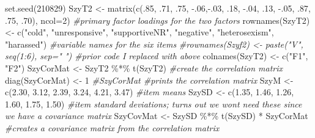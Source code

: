 \documentclass[
  english,
]{book}
\newenvironment{Shaded}{\begin{snugshade}}{\end{snugshade}}
\newcommand{\AttributeTok}[1]{\textcolor[rgb]{0.77,0.63,0.00}{#1}}
\newcommand{\CommentTok}[1]{\textcolor[rgb]{0.56,0.35,0.01}{\textit{#1}}}
\newcommand{\DecValTok}[1]{\textcolor[rgb]{0.00,0.00,0.81}{#1}}
\newcommand{\FloatTok}[1]{\textcolor[rgb]{0.00,0.00,0.81}{#1}}
\newcommand{\FunctionTok}[1]{\textcolor[rgb]{0.00,0.00,0.00}{#1}}
\newcommand{\NormalTok}[1]{#1}
\newcommand{\OtherTok}[1]{\textcolor[rgb]{0.56,0.35,0.01}{#1}}
\newcommand{\SpecialCharTok}[1]{\textcolor[rgb]{0.00,0.00,0.00}{#1}}
\newcommand{\StringTok}[1]{\textcolor[rgb]{0.31,0.60,0.02}{#1}}
\begin{document}
\begin{Shaded}
\begin{Highlighting}[]
\FunctionTok{set.seed}\NormalTok{(}\DecValTok{210829}\NormalTok{)}
\NormalTok{SzyT2 }\OtherTok{\textless{}{-}} \FunctionTok{matrix}\NormalTok{(}\FunctionTok{c}\NormalTok{(.}\DecValTok{85}\NormalTok{, .}\DecValTok{71}\NormalTok{, .}\DecValTok{75}\NormalTok{, }\SpecialCharTok{{-}}\NormalTok{.}\DecValTok{06}\NormalTok{,}\SpecialCharTok{{-}}\NormalTok{.}\DecValTok{03}\NormalTok{, .}\DecValTok{18}\NormalTok{, }\SpecialCharTok{{-}}\NormalTok{.}\DecValTok{04}\NormalTok{, .}\DecValTok{13}\NormalTok{, }\SpecialCharTok{{-}}\NormalTok{.}\DecValTok{05}\NormalTok{, .}\DecValTok{87}\NormalTok{, .}\DecValTok{75}\NormalTok{, .}\DecValTok{70}\NormalTok{), }\AttributeTok{ncol=}\DecValTok{2}\NormalTok{) }\CommentTok{\#primary factor loadings for the two factors}
\FunctionTok{rownames}\NormalTok{(SzyT2) }\OtherTok{\textless{}{-}} \FunctionTok{c}\NormalTok{(}\StringTok{"cold"}\NormalTok{, }\StringTok{"unresponsive"}\NormalTok{, }\StringTok{"supportiveNR"}\NormalTok{, }\StringTok{"negative"}\NormalTok{, }\StringTok{"heterosexism"}\NormalTok{, }\StringTok{"harassed"}\NormalTok{) }\CommentTok{\#variable names for the six items}
\CommentTok{\#rownames(Szyf2) \textless{}{-} paste("V", seq(1:6), sep=" ") \#prior code I replaced with above}
\FunctionTok{colnames}\NormalTok{(SzyT2) }\OtherTok{\textless{}{-}} \FunctionTok{c}\NormalTok{(}\StringTok{"F1"}\NormalTok{, }\StringTok{"F2"}\NormalTok{)}
\NormalTok{SzyCorMat }\OtherTok{\textless{}{-}}\NormalTok{ SzyT2 }\SpecialCharTok{\%*\%} \FunctionTok{t}\NormalTok{(SzyT2) }\CommentTok{\#create the correlation matrix}
\FunctionTok{diag}\NormalTok{(SzyCorMat) }\OtherTok{\textless{}{-}} \DecValTok{1}
\CommentTok{\#SzyCorMat \#prints the correlation matrix}
\NormalTok{SzyM }\OtherTok{\textless{}{-}} \FunctionTok{c}\NormalTok{(}\FloatTok{2.30}\NormalTok{, }\FloatTok{3.12}\NormalTok{, }\FloatTok{2.39}\NormalTok{, }\FloatTok{3.24}\NormalTok{, }\FloatTok{4.21}\NormalTok{, }\FloatTok{3.47}\NormalTok{) }\CommentTok{\#item means}
\NormalTok{SzySD }\OtherTok{\textless{}{-}} \FunctionTok{c}\NormalTok{(}\FloatTok{1.35}\NormalTok{, }\FloatTok{1.46}\NormalTok{, }\FloatTok{1.26}\NormalTok{, }\FloatTok{1.60}\NormalTok{, }\FloatTok{1.75}\NormalTok{, }\FloatTok{1.50}\NormalTok{) }\CommentTok{\#item standard deviations; turns out we won\textquotesingle{}t need these since we have a covariance matrix}
\NormalTok{SzyCovMat }\OtherTok{\textless{}{-}}\NormalTok{ SzySD }\SpecialCharTok{\%*\%} \FunctionTok{t}\NormalTok{(SzySD) }\SpecialCharTok{*}\NormalTok{ SzyCorMat }\CommentTok{\#creates a covariance matrix from the correlation matrix}

\end{Highlighting}
\end{Shaded}
\end{document}
